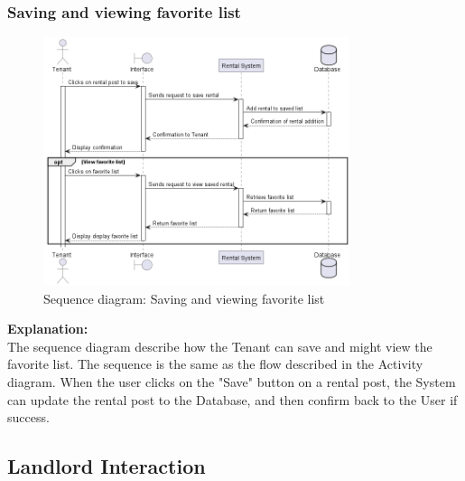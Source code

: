 \subsubsection{Saving and viewing favorite list}
\begin{figure}[H]
    \centering
    \includegraphics[width=0.8\textwidth]{Images/Sequence/seq_diag_save_&_view_saved_rental.png}
    \caption{Sequence diagram: Saving and viewing favorite list}
    \label{fig:seq-diag-favorite}
\end{figure}
\noindent \textbf{Explanation:}\\
The sequence diagram describe how the Tenant can save and might view the favorite list. The sequence is the same as the flow described in the Activity diagram. When the user clicks on the "Save" button on a rental post, the System can update the rental post to the Database, and then confirm back to the User if success.


\newpage
\subsection{Landlord Interaction}
